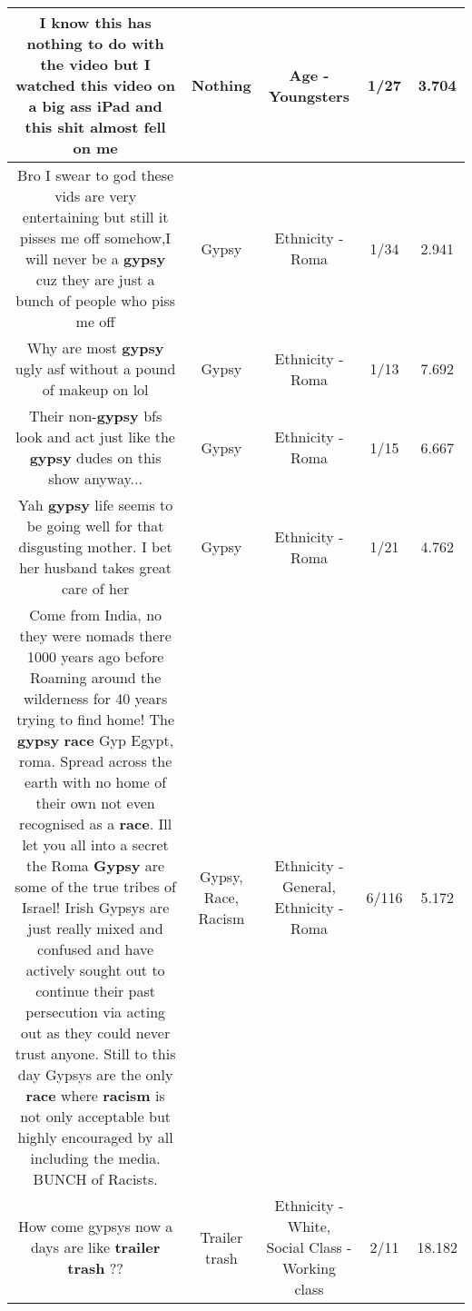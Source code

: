 \documentclass[11pt]{article}
\newlength\mylength
\begin{document}
\begin{center}
\begin{longtable}{|C{.65\mylength}|C{.30\mylength}|C{.12\mylength}|C{.12\mylength}|C{.12\mylength}|}
  \small I know this has \textbf{nothing} to do with the video but I watched this video on a big ass iPad and this shit almost fell on me\normalsize   & Nothing & Age - Youngsters & 1/27 & 3.704 \\  \hline
  \small Bro I swear to god these vids are very entertaining but still it pisses me off somehow,I will never be a \textbf{gypsy} cuz they are just a bunch of people who piss me off\normalsize   & Gypsy & Ethnicity - Roma & 1/34 & 2.941 \\  \hline
  \small Why are most \textbf{gypsy} ugly asf without a pound of makeup on lol\normalsize   & Gypsy & Ethnicity - Roma & 1/13 & 7.692 \\  \hline
  \small Their non-\textbf{gypsy} bfs look and act just like the \textbf{gypsy} dudes on this show anyway...\normalsize   & Gypsy & Ethnicity - Roma & 1/15 & 6.667 \\  \hline
  \small Yah \textbf{gypsy} life seems to be going well for that disgusting mother. I bet her husband takes great care of her\normalsize   & Gypsy & Ethnicity - Roma & 1/21 & 4.762 \\  \hline
  \small Come from India, no they were nomads there 1000 years ago before Roaming around the wilderness for 40 years trying to find home! The \textbf{gypsy} \textbf{race} Gyp Egypt, roma. Spread across the earth with no home of their own not even recognised as a \textbf{race}. Ill let you all into a secret the Roma \textbf{Gypsy} are some of the true tribes of Israel! Irish Gypsys are just really mixed and confused and have actively sought out to continue their past persecution via acting out as they could never trust anyone. Still to this day Gypsys are the only \textbf{race} where \textbf{racism} is not only acceptable but highly encouraged by all including the media. BUNCH of Racists.\normalsize   & Gypsy, Race, Racism & Ethnicity - General, Ethnicity - Roma & 6/116 & 5.172 \\  \hline
  \small How come gypsys now a days are like \textbf{t\textbf{railer trash}} ??\normalsize   & Trailer trash & Ethnicity - White, Social Class - Working class & 2/11 & 18.182 \\  \hline

\end{longtable}
\end{center}
\end{document}

